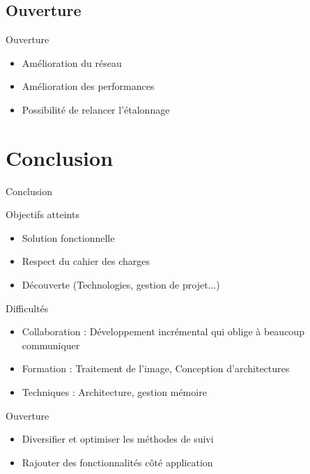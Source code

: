 \documentclass{beamer}
\begin{document}
		\subsection{Ouverture}
		\begin{frame}{Ouverture}
			\begin{itemize}
				\item Amélioration du réseau
				\item Amélioration des performances
				\item Possibilité de relancer l'étalonnage
			\end{itemize}
		\end{frame}

	
      \section{Conclusion}
            \begin{frame}{Conclusion}
                  \begin{exampleblock}{Objectifs atteints}
			\begin{itemize}
                        \item Solution fonctionnelle \\
                        \item Respect du cahier des charges \\
                        \item Découverte (Technologies, gestion de projet...) \\ 
			\end{itemize}
                  \end{exampleblock}
                  \pause
                  \begin{alertblock}{Difficultés}
			\begin{itemize}
                        \item Collaboration : Développement incrémental qui oblige à beaucoup communiquer \\
                        \item Formation : Traitement de l'image, Conception d'architectures \\
                        \item Techniques : Architecture, gestion mémoire\\
			\end{itemize}
                  \end{alertblock}
                  \pause
                  \begin{block}{Ouverture}
			\begin{itemize}
                        \item Diversifier et optimiser les méthodes de suivi \\
                        \item Rajouter des fonctionnalités côté application \\
			\end{itemize}
                  \end{block}
	\end{frame}
      
\end{document}
